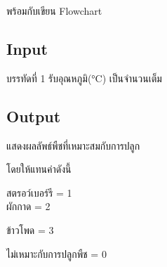 \documentclass{article}
\begin{document}
\hfill\break



พร้อมกับเขียน Flowchart



\subsection*{Input}
บรรทัดที่ 1 รับอุณหภูมิ(°C) เป็นจำนวนเต็ม



\subsection*{Output}
แสดงผลลัพธ์พืชที่เหมาะสมกับการปลูก



โดยให้แทนค่าดังนี้



{สตรอว์เบอร์รี = 1}\\



ผักกาด = 2



ข้าวโพด = 3



ไม่เหมาะกับการปลูกพืช = 0
\end{document}
